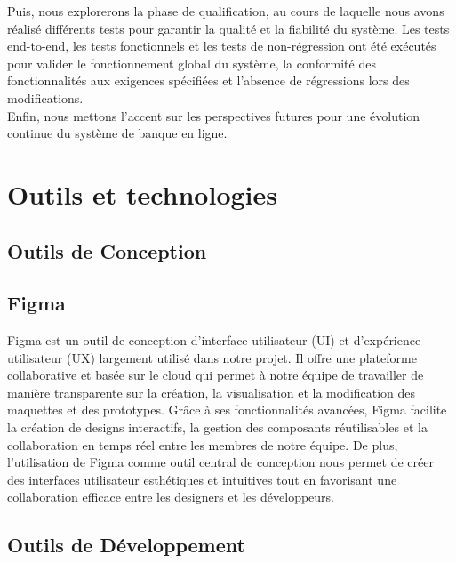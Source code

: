 Puis, nous explorerons la phase de qualification, au cours de laquelle nous avons réalisé différents tests pour garantir la qualité et la fiabilité du système. Les tests end-to-end, les tests fonctionnels et les tests de non-régression ont été exécutés pour valider le fonctionnement global du système, la conformité des fonctionnalités aux exigences spécifiées et l'absence de régressions lors des modifications.\\

Enfin, nous mettons l'accent sur les perspectives futures pour une évolution continue du système de banque en ligne.
\section{Outils et technologies}
\subsection{Outils de Conception}
\subsection*{Figma}
Figma est un outil de conception d'interface utilisateur (UI) et d'expérience utilisateur (UX) largement utilisé dans notre projet. Il offre une plateforme collaborative et basée sur le cloud qui permet à notre équipe de travailler de manière transparente sur la création, la visualisation et la modification des maquettes et des prototypes. Grâce à ses fonctionnalités avancées, Figma facilite la création de designs interactifs, la gestion des composants réutilisables et la collaboration en temps réel entre les membres de notre équipe. De plus, l'utilisation de Figma comme outil central de conception nous permet de créer des interfaces utilisateur esthétiques et intuitives tout en favorisant une collaboration efficace entre les designers et les développeurs.

\subsection{Outils de Développement }
